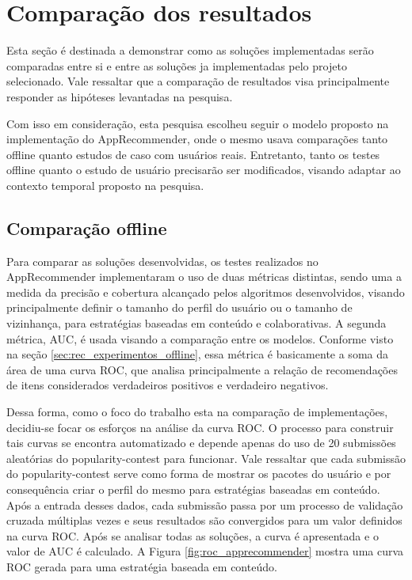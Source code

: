 \section{Comparação dos resultados}

Esta seção é destinada a demonstrar como as soluções implementadas serão
comparadas entre si e entre as soluções ja implementadas pelo projeto
selecionado. Vale ressaltar que a comparação de resultados visa principalmente
responder as hipóteses levantadas na pesquisa.

Com isso em consideração, esta pesquisa escolheu seguir o modelo proposto na
implementação do AppRecommender, onde o mesmo usava comparações tanto offline
quanto estudos de caso com usuários reais. Entretanto, tanto os testes offline
quanto o estudo de usuário precisarão ser modificados, visando adaptar ao
contexto temporal proposto na pesquisa.

\subsection{Comparação offline}

Para comparar as soluções desenvolvidas, os testes realizados no AppRecommender
implementaram o uso de duas métricas distintas, sendo uma a medida da precisão e
cobertura alcançado pelos algoritmos desenvolvidos, visando principalmente
definir o tamanho do perfil do usuário ou o tamanho de vizinhança, para
estratégias baseadas em conteúdo e colaborativas. A segunda métrica, AUC, é
usada visando a comparação entre os modelos. Conforme visto na seção
\ref{sec:rec_experimentos_offline}, essa métrica é basicamente a soma da área de uma curva ROC,
que analisa principalmente a relação de recomendações de itens considerados
verdadeiros positivos e verdadeiro negativos.

Dessa forma, como o foco do trabalho esta na comparação de implementações,
decidiu-se focar os esforços na análise da curva ROC. O processo para construir
tais curvas se encontra automatizado e depende apenas do uso de
20 submissões aleatórias do popularity-contest para funcionar. Vale ressaltar
que cada submissão do popularity-contest serve como forma de mostrar os pacotes
do usuário e por consequência criar o perfil do mesmo para estratégias baseadas
em conteúdo. Após a entrada desses dados, cada submissão passa por um processo de
validação cruzada múltiplas vezes e seus resultados são convergidos para um
valor definidos na curva ROC. Após se analisar todas as soluções, a curva é
apresentada e o valor de AUC é calculado. A Figura \ref{fig:roc_apprecommender}
mostra uma curva ROC gerada para uma estratégia baseada em conteúdo.

